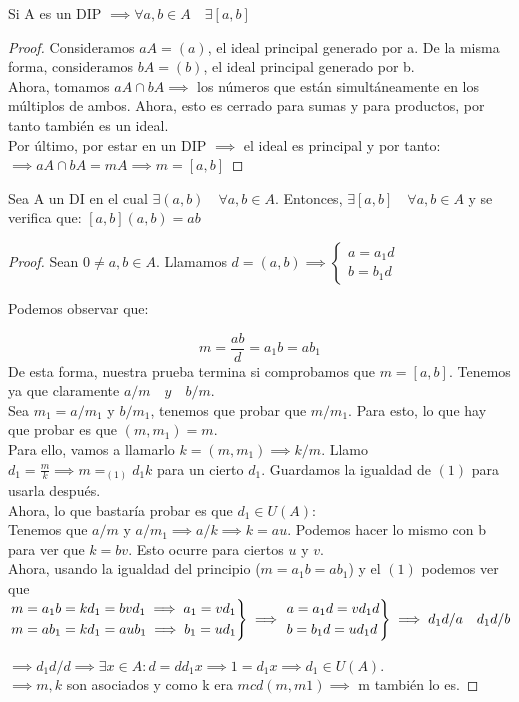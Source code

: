 \begin{nprop}
	Si A es un DIP $\implies \forall a,b \in A \quad \exists [a,b]$
\end{nprop}
\begin{proof}
	Consideramos $aA = (a)$, el ideal principal generado por a. De la misma forma, consideramos $bA = (b)$, el ideal principal generado por b.\\
	Ahora, tomamos $aA \cap bA \implies$ los números que están simultáneamente en los múltiplos de ambos.
	Ahora, esto es cerrado para sumas y para productos, por tanto también es un ideal.\\
	Por último, por estar en un DIP $\implies$ el ideal es principal y por tanto:\\ $\implies aA\cap bA = mA \implies m = [a,b]$
\end{proof}


\begin{nth}
	Sea A un DI en el cual $\exists(a,b) \quad \forall a,b \in A.$ Entonces, $\exists [a,b] \quad \forall a,b \in A $ y se verifica que: $[a,b](a,b) = ab$
\end{nth}
\begin{proof}
	Sean $0 \ne a,b \in A$. Llamamos $d=(a,b) \implies \begin{cases}
	a = a_1 d\\
	b = b_1 d
\end{cases}$

Podemos observar que:

\[
m = \frac{ab}{d} = a_1b = ab_1
\]
De esta forma, nuestra prueba termina si comprobamos que $m = [a,b]$. Tenemos ya que claramente $a/m \quad y \quad b/m$.\\

Sea $m_1 = a/m_1 $ y $b/m_1$, tenemos que probar que $m/m_1$. Para esto, lo que hay que probar es que $(m,m_1) = m$.\\
Para ello, vamos a llamarlo $k = (m,m_1) \implies k/m$. Llamo $d_1 = \frac{m}{k} \implies m =_{(1)} d_1k$ para un cierto $d_1$. Guardamos la igualdad de $(1)$ para usarla después.\\
Ahora, lo que bastaría probar es que $d_1 \in U(A)$:\\
Tenemos que $a/m$ y $a/m_1 \implies a /k \implies k = au$. Podemos hacer lo mismo con b para ver que $k = bv$. Esto ocurre para ciertos $u$ y $v$.\\
Ahora, usando la igualdad del principio ($m = a_1b = ab_1$) y el $(1)$ podemos ver que $\begin{rcases}
	m = a_1b = kd_1 = bvd_1 \implies a_1 = vd_1\\
m = ab_1 = kd_1 = aub_1  \implies  b_1 = ud_1
\end{rcases} \implies \begin{rcases}
	a = a_1d = vd_1 d\\
b = b_1d = ud_1d
\end{rcases} \implies d_1d/a \quad d_1d/b$


$\implies d_1d /d \implies \exists x \in A : d = dd_1 x \implies 1 = d_1 x \implies d_1 \in U(A)$.\\
$\implies m,k$ son asociados y como k era $mcd(m,m1) \implies$ m también lo es.
\end{proof}


